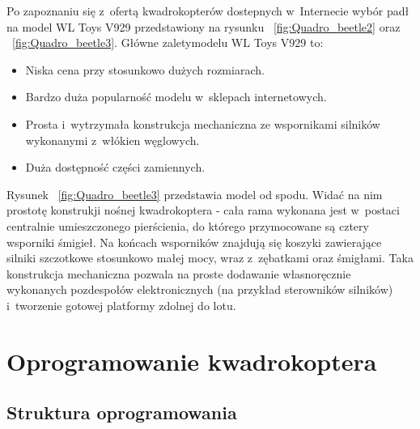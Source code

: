 \documentclass[11pt, twoside]{Thesis} %
\begin{document}
Po zapoznaniu się z~ofertą kwadrokopterów dostepnych w~Internecie wybór padł na model WL Toys V929 przedstawiony na rysunku ~\ref{fig:Quadro_beetle2} oraz ~\ref{fig:Quadro_beetle3}. Główne zaletymodelu WL Toys V929 to:

\begin{itemize}
	\item Niska cena przy stosunkowo dużych rozmiarach.
	\item Bardzo duża popularność modelu w~sklepach internetowych.
	\item Prosta i~wytrzymała konstrukcja mechaniczna ze wspornikami silników wykonanymi z~włókien węglowych.
	\item Duża dostępność części zamiennych.
\end{itemize}



Rysunek ~\ref{fig:Quadro_beetle3} przedstawia model od spodu. Widać na nim prostotę konstrukji nośnej kwadrokoptera - cała rama wykonana jest w~postaci centralnie umieszczonego pierścienia, do którego przymocowane są cztery wsporniki śmigieł. Na końcach wsporników znajdują się koszyki zawierające silniki szczotkowe stosunkowo małej mocy, wraz z~zębatkami oraz śmigłami. Taka konstrukcja mechaniczna pozwala na proste dodawanie własnoręcznie wykonanych pozdespołów elektronicznych (na przykład sterowników silników) i~tworzenie gotowej platformy zdolnej do lotu. 


% 

\chapter{Oprogramowanie kwadrokoptera} %

\label{Chapter6} %


\section{Struktura oprogramowania}
\end{document}
